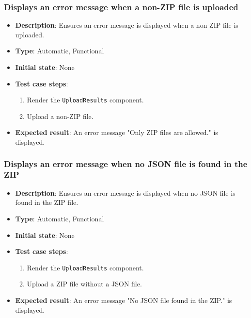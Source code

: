 \documentclass[12pt, titlepage]{article}
\begin{document}
\subsubsection{Displays an error message when a non-ZIP file is uploaded}
\begin{itemize}
    \item \textbf{Description}: Ensures an error message is displayed when a non-ZIP file is uploaded.
    \item \textbf{Type}: Automatic, Functional
    \item \textbf{Initial state}: None
    \item \textbf{Test case steps}:
    \begin{enumerate}
        \item Render the \texttt{UploadResults} component.
        \item Upload a non-ZIP file.
    \end{enumerate}
    \item \textbf{Expected result}: An error message "Only ZIP files are allowed." is displayed.
\end{itemize}

\subsubsection{Displays an error message when no JSON file is found in the ZIP}
\begin{itemize}
    \item \textbf{Description}: Ensures an error message is displayed when no JSON file is found in the ZIP file.
    \item \textbf{Type}: Automatic, Functional
    \item \textbf{Initial state}: None
    \item \textbf{Test case steps}:
    \begin{enumerate}
        \item Render the \texttt{UploadResults} component.
        \item Upload a ZIP file without a JSON file.
    \end{enumerate}
    \item \textbf{Expected result}: An error message "No JSON file found in the ZIP." is displayed.
\end{itemize}
\end{document}
